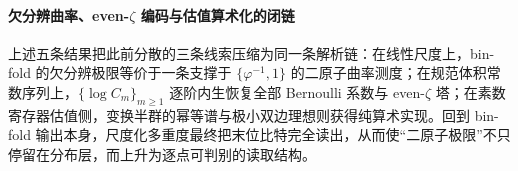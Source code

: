 \paragraph{欠分辨曲率、even-\texorpdfstring{$\zeta$}{zeta} 编码与估值算术化的闭链}
上述五条结果把此前分散的三条线索压缩为同一条解析链：在线性尺度上，bin-fold 的欠分辨极限等价于一条支撑于 \(\{\varphi^{-1},1\}\) 的二原子曲率测度；在规范体积常数序列上，\(\{\log C_m\}_{m\ge 1}\) 逐阶内生恢复全部 Bernoulli 系数与 even-\(\zeta\) 塔；在素数寄存器估值侧，变换半群的幂等谱与极小双边理想则获得纯算术实现。回到 bin-fold 输出本身，尺度化多重度最终把末位比特完全读出，从而使“二原子极限”不只停留在分布层，而上升为逐点可判别的读取结构。
